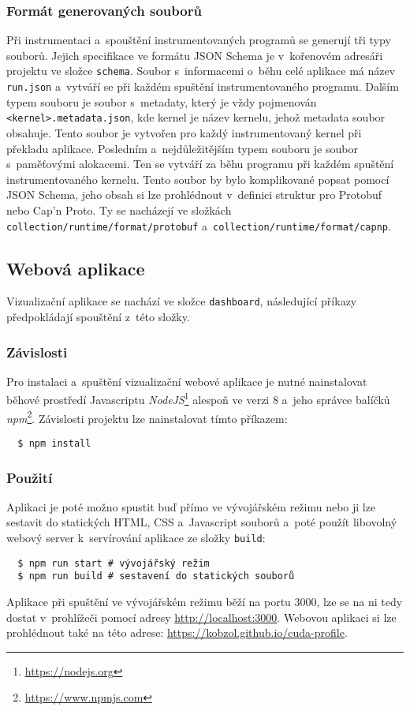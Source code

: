 \subsubsection{Formát generovaných souborů}
Při instrumentaci a~spouštění instrumentovaných programů se generují tři typy souborů. Jejich specifikace ve formátu JSON Schema je v~kořenovém adresáři projektu ve složce \texttt{schema}. Soubor s~informacemi o~běhu celé aplikace má název \texttt{run.json} a~vytváří se při každém spuštění instrumentovaného programu. Dalším typem souboru je soubor s~metadaty, který je vždy pojmenován \texttt{<kernel>.metadata.json}, kde kernel je název kernelu, jehož metadata soubor obsahuje. Tento soubor je vytvořen pro každý instrumentovaný kernel při překladu aplikace. Posledním a~nejdůležitějším typem souboru je soubor s~paměťovými alokacemi. Ten se vytváří za běhu programu při každém spuštění instrumentovaného kernelu. Tento soubor by bylo komplikované popsat pomocí JSON Schema, jeho obsah si lze prohlédnout v~definici struktur pro Protobuf nebo Cap'n Proto. Ty se nacházejí ve složkách \texttt{collection/runtime/format/protobuf} a~\texttt{collection/runtime/format/capnp}.

\subsection{Webová aplikace}
Vizualizační aplikace se nachází ve složce \texttt{dashboard}, následující příkazy předpokládají spouštění z~této složky.

\subsubsection{Závislosti}
Pro instalaci a~spuštění vizualizační webové aplikace je nutné nainstalovat běhové prostředí Javascriptu \emph{NodeJS}\footnote{\url{https://nodejs.org}} alespoň ve verzi 8 a~jeho správce balíčků \emph{npm}\footnote{\url{https://www.npmjs.com}}. Závislosti projektu lze nainstalovat tímto příkazem:
\begin{verbatim}
  $ npm install
\end{verbatim}

\subsubsection{Použití}
Aplikaci je poté možno spustit buď přímo ve vývojářském režimu nebo ji lze sestavit do statických HTML, CSS a~Javascript souborů a~poté použít libovolný webový server k~servírování aplikace ze složky \texttt{build}:
\begin{verbatim}
  $ npm run start # vývojářský režim
  $ npm run build # sestavení do statických souborů
\end{verbatim}

Aplikace při spuštění ve vývojářském režimu běží na portu 3000, lze se na ni tedy dostat v~prohlížeči pomocí adresy \url{http://localhost:3000}.
Webovou aplikaci si lze prohlédnout také na této adrese: \url{https://kobzol.github.io/cuda-profile}.
